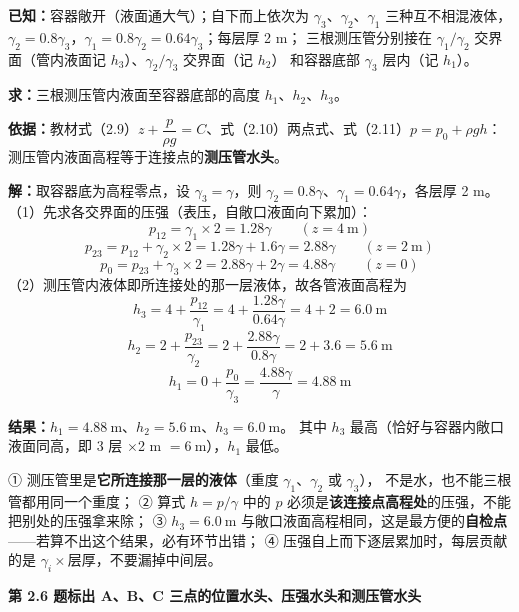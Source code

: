 \begin{jie}
\textbf{已知：}容器敞开（液面通大气）；自下而上依次为 $\gamma_3$、$\gamma_2$、$\gamma_1$ 三种互不相混液体，
$\gamma_2=0.8\gamma_3$，$\gamma_1=0.8\gamma_2=0.64\gamma_3$；每层厚 2 m；
三根测压管分别接在 $\gamma_1/\gamma_2$ 交界面（管内液面记 $h_3$）、$\gamma_2/\gamma_3$ 交界面（记 $h_2$）
和容器底部 $\gamma_3$ 层内（记 $h_1$）。

\textbf{求：}三根测压管内液面至容器底部的高度 $h_1$、$h_2$、$h_3$。

\textbf{依据：}教材式（2.9）$z+\dfrac{p}{\rho g}=C$、式（2.10）两点式、式（2.11）$p=p_0+\rho gh$：
测压管内液面高程等于连接点的\textbf{测压管水头}。

\textbf{解：}取容器底为高程零点，设 $\gamma_3=\gamma$，则 $\gamma_2=0.8\gamma$、$\gamma_1=0.64\gamma$，各层厚 2 m。
（1）先求各交界面的压强（表压，自敞口液面向下累加）：
\[ p_{12}=\gamma_1\times2=1.28\gamma\qquad(z=4\ \mathrm{m}) \]
\[ p_{23}=p_{12}+\gamma_2\times2=1.28\gamma+1.6\gamma=2.88\gamma\qquad(z=2\ \mathrm{m}) \]
\[ p_{0}=p_{23}+\gamma_3\times2=2.88\gamma+2\gamma=4.88\gamma\qquad(z=0) \]
（2）测压管内液体即所连接处的那一层液体，故各管液面高程为
\[ h_3=4+\frac{p_{12}}{\gamma_1}=4+\frac{1.28\gamma}{0.64\gamma}=4+2=6.0\ \mathrm{m} \]
\[ h_2=2+\frac{p_{23}}{\gamma_2}=2+\frac{2.88\gamma}{0.8\gamma}=2+3.6=5.6\ \mathrm{m} \]
\[ h_1=0+\frac{p_{0}}{\gamma_3}=\frac{4.88\gamma}{\gamma}=4.88\ \mathrm{m} \]

\textbf{结果：}$h_1=4.88\ \mathrm{m}$、$h_2=5.6\ \mathrm{m}$、$h_3=6.0\ \mathrm{m}$。
其中 $h_3$ 最高（恰好与容器内敞口液面同高，即 3 层 $\times$2 m $=6\ \mathrm{m}$），$h_1$ 最低。
\end{jie}

\begin{yicuo}
① 测压管里是\textbf{它所连接那一层的液体}（重度 $\gamma_1$、$\gamma_2$ 或 $\gamma_3$），
不是水，也不能三根管都用同一个重度；
② 算式 $h=p/\gamma$ 中的 $p$ 必须是\textbf{该连接点高程处}的压强，不能把别处的压强拿来除；
③ $h_3=6.0\ \mathrm{m}$ 与敞口液面高程相同，这是最方便的\textbf{自检点}——若算不出这个结果，必有环节出错；
④ 压强自上而下逐层累加时，每层贡献的是 $\gamma_i\times$层厚，不要漏掉中间层。
\end{yicuo}

\noindent\textbf{第 2.6 题\quad 标出 A、B、C 三点的位置水头、压强水头和测压管水头}

